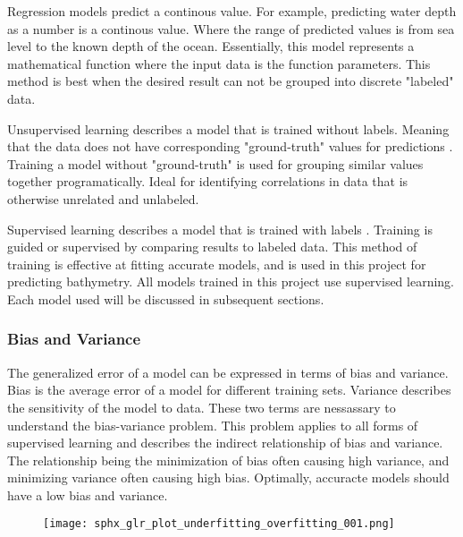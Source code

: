 \par
Regression models predict a continous value.
For example, predicting water depth as a number is a continous value.
Where the range of predicted values is from sea level to the known depth of the ocean.
Essentially, this model represents a mathematical function where the input data is the function parameters.
This method is best when the desired result can not be grouped into discrete "labeled" data.

\par
Unsupervised learning describes a model that is trained without labels.
Meaning that the data does not have corresponding "ground-truth" values for predictions \cite{bishop2006pattern}.
Training a model without "ground-truth" is used for grouping similar values together programatically.
Ideal for identifying correlations in data that is otherwise unrelated and unlabeled.

\par
Supervised learning describes a model that is trained with labels \cite{bishop2006pattern}.
Training is guided or supervised by comparing results to labeled data.
This method of training is effective at fitting accurate models, and is used in this project for predicting bathymetry.
All models trained in this project use supervised learning.
Each model used will be discussed in subsequent sections.

\subsubsection{Bias and Variance}
The generalized error of a model can be expressed in terms of bias and variance.
Bias is the average error of a model for different training sets.
Variance describes the sensitivity of the model to data.
These two terms are nessassary to understand the bias-variance problem.
This problem applies to all forms of supervised learning \cite{geman1992neural} and describes the indirect relationship of bias and variance.
The relationship being the minimization of bias often causing high variance, and minimizing variance often causing high bias.
Optimally, accuracte models should have a low bias and variance.

\begin{figure}[]
    \centering
    \texttt{[image: sphx\_glr\_plot\_underfitting\_overfitting\_001.png]}
    \caption{}
    \label{}
\end{figure}

